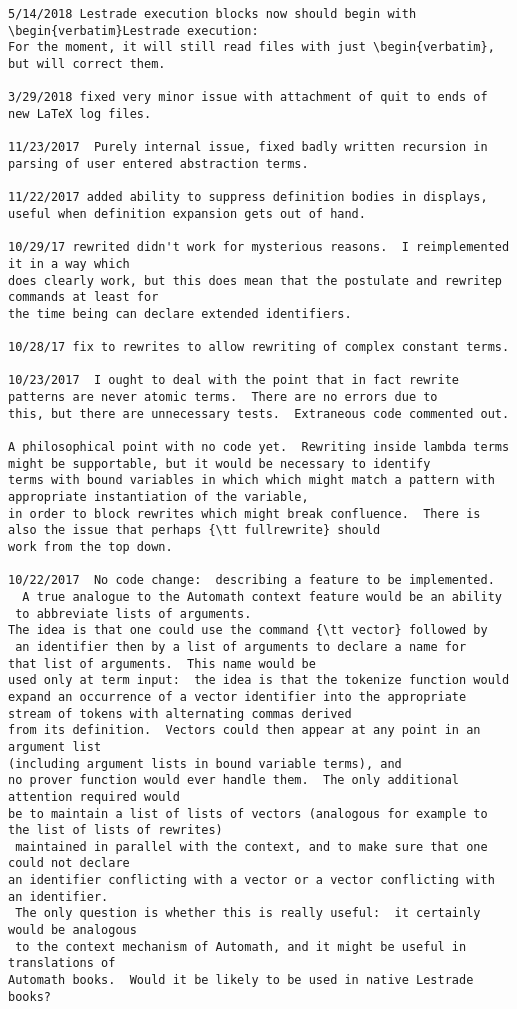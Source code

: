 \documentclass{article}
\begin{document}
{\begin{verbatim}
5/14/2018 Lestrade execution blocks now should begin with \begin{verbatim}Lestrade execution:
For the moment, it will still read files with just \begin{verbatim}, but will correct them.

3/29/2018 fixed very minor issue with attachment of quit to ends of new LaTeX log files.

11/23/2017  Purely internal issue, fixed badly written recursion in parsing of user entered abstraction terms.

11/22/2017 added ability to suppress definition bodies in displays, useful when definition expansion gets out of hand.

10/29/17 rewrited didn't work for mysterious reasons.  I reimplemented it in a way which
does clearly work, but this does mean that the postulate and rewritep commands at least for
the time being can declare extended identifiers.

10/28/17 fix to rewrites to allow rewriting of complex constant terms.

10/23/2017  I ought to deal with the point that in fact rewrite patterns are never atomic terms.  There are no errors due to
this, but there are unnecessary tests.  Extraneous code commented out.

A philosophical point with no code yet.  Rewriting inside lambda terms might be supportable, but it would be necessary to identify
terms with bound variables in which which might match a pattern with appropriate instantiation of the variable,
in order to block rewrites which might break confluence.  There is also the issue that perhaps {\tt fullrewrite} should
work from the top down.

10/22/2017  No code change:  describing a feature to be implemented.
  A true analogue to the Automath context feature would be an ability
 to abbreviate lists of arguments.
The idea is that one could use the command {\tt vector} followed by
 an identifier then by a list of arguments to declare a name for 
that list of arguments.  This name would be
used only at term input:  the idea is that the tokenize function would 
expand an occurrence of a vector identifier into the appropriate 
stream of tokens with alternating commas derived
from its definition.  Vectors could then appear at any point in an argument list 
(including argument lists in bound variable terms), and 
no prover function would ever handle them.  The only additional attention required would
be to maintain a list of lists of vectors (analogous for example to the list of lists of rewrites)
 maintained in parallel with the context, and to make sure that one could not declare
an identifier conflicting with a vector or a vector conflicting with an identifier. 
 The only question is whether this is really useful:  it certainly would be analogous
 to the context mechanism of Automath, and it might be useful in translations of 
Automath books.  Would it be likely to be used in native Lestrade books?


\end{verbatim}}
\end{document}

